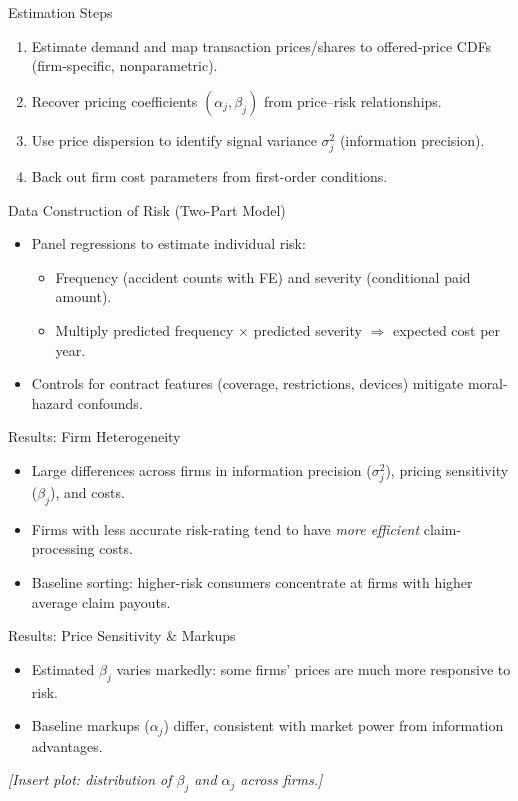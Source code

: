 \documentclass[10pt,aspectratio=169]{beamer}
\begin{document}
\begin{frame}{Estimation Steps}
\justifying
\begin{enumerate}
  \item Estimate demand and map transaction prices/shares to offered-price CDFs (firm-specific, nonparametric).
  \item Recover pricing coefficients $(\alpha_j,\beta_j)$ from price–risk relationships.
  \item Use price dispersion to identify signal variance $\sigma_j^2$ (information precision).
  \item Back out firm cost parameters from first-order conditions.
\end{enumerate}
\end{frame}

\begin{frame}{Data Construction of Risk (Two-Part Model)}
\justifying
\begin{itemize}
  \item Panel regressions to estimate individual risk:
  \begin{itemize}
    \item Frequency (accident counts with FE) and severity (conditional paid amount).
    \item Multiply predicted frequency $\times$ predicted severity $\Rightarrow$ expected cost per year.
  \end{itemize}
  \item Controls for contract features (coverage, restrictions, devices) mitigate moral-hazard confounds.
\end{itemize}
\end{frame}

\begin{frame}{Results: Firm Heterogeneity}
\justifying
\begin{itemize}
  \item Large differences across firms in information precision ($\sigma_j^2$), pricing sensitivity ($\beta_j$), and costs.
  \item Firms with less accurate risk-rating tend to have \emph{more efficient} claim-processing costs.
  \item Baseline sorting: higher-risk consumers concentrate at firms with higher average claim payouts.
\end{itemize}
\end{frame}

\begin{frame}{Results: Price Sensitivity \& Markups}
\justifying
\begin{itemize}
  \item Estimated $\beta_j$ varies markedly: some firms’ prices are much more responsive to risk.
  \item Baseline markups ($\alpha_j$) differ, consistent with market power from information advantages.
\end{itemize}
\vspace{0.75em}
\begin{center}
\textit{[Insert plot: distribution of $\beta_j$ and $\alpha_j$ across firms.]}
\end{center}
\end{frame}
\end{document}
